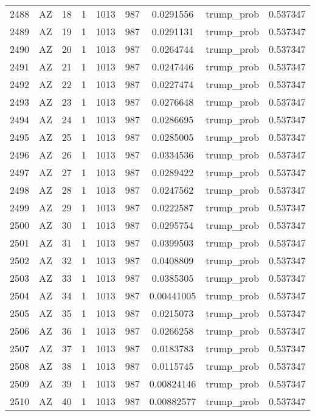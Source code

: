 \documentclass[12pt,a4paper]{article}
\begin{document}
\begin{tabular}{r|cccccccc}
	2488 & AZ & 18 & 1 & 1013 & 987 & 0.0291556 & trump\_prob & 0.537347 \\
	2489 & AZ & 19 & 1 & 1013 & 987 & 0.0291131 & trump\_prob & 0.537347 \\
	2490 & AZ & 20 & 1 & 1013 & 987 & 0.0264744 & trump\_prob & 0.537347 \\
	2491 & AZ & 21 & 1 & 1013 & 987 & 0.0247446 & trump\_prob & 0.537347 \\
	2492 & AZ & 22 & 1 & 1013 & 987 & 0.0227474 & trump\_prob & 0.537347 \\
	2493 & AZ & 23 & 1 & 1013 & 987 & 0.0276648 & trump\_prob & 0.537347 \\
	2494 & AZ & 24 & 1 & 1013 & 987 & 0.0286695 & trump\_prob & 0.537347 \\
	2495 & AZ & 25 & 1 & 1013 & 987 & 0.0285005 & trump\_prob & 0.537347 \\
	2496 & AZ & 26 & 1 & 1013 & 987 & 0.0334536 & trump\_prob & 0.537347 \\
	2497 & AZ & 27 & 1 & 1013 & 987 & 0.0289422 & trump\_prob & 0.537347 \\
	2498 & AZ & 28 & 1 & 1013 & 987 & 0.0247562 & trump\_prob & 0.537347 \\
	2499 & AZ & 29 & 1 & 1013 & 987 & 0.0222587 & trump\_prob & 0.537347 \\
	2500 & AZ & 30 & 1 & 1013 & 987 & 0.0295754 & trump\_prob & 0.537347 \\
	2501 & AZ & 31 & 1 & 1013 & 987 & 0.0399503 & trump\_prob & 0.537347 \\
	2502 & AZ & 32 & 1 & 1013 & 987 & 0.0408809 & trump\_prob & 0.537347 \\
	2503 & AZ & 33 & 1 & 1013 & 987 & 0.0385305 & trump\_prob & 0.537347 \\
	2504 & AZ & 34 & 1 & 1013 & 987 & 0.00441005 & trump\_prob & 0.537347 \\
	2505 & AZ & 35 & 1 & 1013 & 987 & 0.0215073 & trump\_prob & 0.537347 \\
	2506 & AZ & 36 & 1 & 1013 & 987 & 0.0266258 & trump\_prob & 0.537347 \\
	2507 & AZ & 37 & 1 & 1013 & 987 & 0.0183783 & trump\_prob & 0.537347 \\
	2508 & AZ & 38 & 1 & 1013 & 987 & 0.0115745 & trump\_prob & 0.537347 \\
	2509 & AZ & 39 & 1 & 1013 & 987 & 0.00824146 & trump\_prob & 0.537347 \\
	2510 & AZ & 40 & 1 & 1013 & 987 & 0.00882577 & trump\_prob & 0.537347 \\

\end{tabular}
\end{document}
